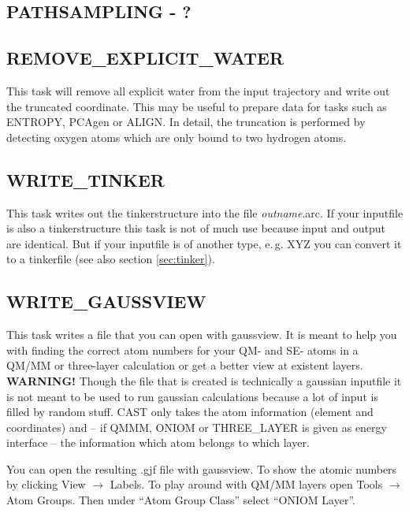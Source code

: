\documentclass[10pt,a4paper]{article} %
\newif\ifdevmode %
\begin{document}
	\subsection{PATHSAMPLING - ?}	
	\ifdevmode \colorbox{red}{write something here} \fi	
	
	\subsection{REMOVE\_EXPLICIT\_WATER}	
	This task will remove all explicit water from the input trajectory and write out the truncated coordinate. This may be useful to prepare data for tasks such as ENTROPY, PCAgen or ALIGN. In detail, the truncation is performed by detecting oxygen atoms which are only bound to two hydrogen atoms.\\
	
	\subsection{WRITE\_TINKER}
	This task writes out the tinkerstructure into the file \textit{outname}.arc. If your inputfile is also a tinkerstructure this task is not of much use because input and output are identical. But if your inputfile is of another type, e.\,g. XYZ you can convert it to a tinkerfile (see also section \ref{sec:tinker}).
	
	\subsection{WRITE\_GAUSSVIEW}
	This task writes a file that you can open with gaussview. It is meant to help you with finding the correct atom numbers for your QM- and SE- atoms in a QM/MM or three-layer calculation or get a better view at existent layers.
	\textbf{WARNING!} Though the file that is created is technically a gaussian inputfile it is not meant to be used to run gaussian calculations because a lot of input is filled by random stuff. CAST only takes the atom information (element and coordinates) and -- if QMMM, ONIOM or THREE\_LAYER is given as energy interface -- the information which atom belongs to which layer.
	
	You can open the resulting .gjf file with gaussview. To show the atomic numbers by clicking View $\rightarrow$ Labels. To play around with QM/MM layers open Tools $\rightarrow$ Atom Groups. Then under "`Atom Group Class"' select "`ONIOM Layer"'.
	
\end{document}
